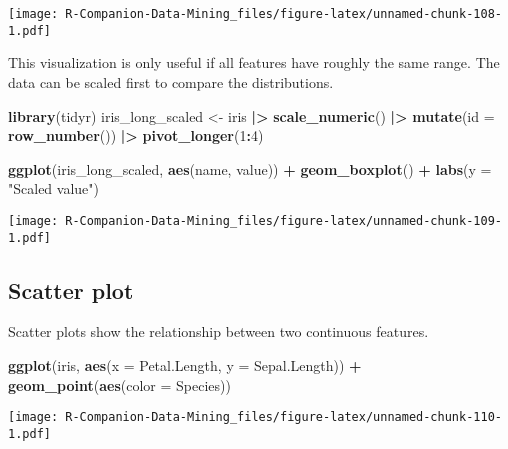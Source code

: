 \documentclass[
  notitlepage]{book}
\newenvironment{Shaded}{\begin{snugshade}}{\end{snugshade}}
\newcommand{\DataTypeTok}[1]{\textcolor[rgb]{0.13,0.29,0.53}{#1}}
\newcommand{\DecValTok}[1]{\textcolor[rgb]{0.00,0.00,0.81}{#1}}
\newcommand{\ErrorTok}[1]{\textcolor[rgb]{0.64,0.00,0.00}{\textbf{#1}}}
\newcommand{\KeywordTok}[1]{\textcolor[rgb]{0.13,0.29,0.53}{\textbf{#1}}}
\newcommand{\NormalTok}[1]{#1}
\newcommand{\OperatorTok}[1]{\textcolor[rgb]{0.81,0.36,0.00}{\textbf{#1}}}
\newcommand{\StringTok}[1]{\textcolor[rgb]{0.31,0.60,0.02}{#1}}
\begin{document}
\texttt{[image: R-Companion-Data-Mining\_files/figure-latex/unnamed-chunk-108-1.pdf]}

This visualization is only useful if all features have roughly the same
range. The data can be scaled first to compare the distributions.

\begin{Shaded}
\begin{Highlighting}[]
\KeywordTok{library}\NormalTok{(tidyr)}
\NormalTok{iris\_long\_scaled \textless{}{-}}\StringTok{ }\NormalTok{iris }\OperatorTok{|}\ErrorTok{\textgreater{}}\StringTok{ }
\StringTok{  }\KeywordTok{scale\_numeric}\NormalTok{() }\OperatorTok{|}\ErrorTok{\textgreater{}}\StringTok{ }
\StringTok{  }\KeywordTok{mutate}\NormalTok{(}\DataTypeTok{id =} \KeywordTok{row\_number}\NormalTok{()) }\OperatorTok{|}\ErrorTok{\textgreater{}}\StringTok{ }\KeywordTok{pivot\_longer}\NormalTok{(}\DecValTok{1}\OperatorTok{:}\DecValTok{4}\NormalTok{)}

\KeywordTok{ggplot}\NormalTok{(iris\_long\_scaled, }\KeywordTok{aes}\NormalTok{(name, value)) }\OperatorTok{+}\StringTok{ }
\StringTok{  }\KeywordTok{geom\_boxplot}\NormalTok{() }\OperatorTok{+}
\StringTok{  }\KeywordTok{labs}\NormalTok{(}\DataTypeTok{y =} \StringTok{"Scaled value"}\NormalTok{)}
\end{Highlighting}
\end{Shaded}

\texttt{[image: R-Companion-Data-Mining\_files/figure-latex/unnamed-chunk-109-1.pdf]}

\hypertarget{scatter-plot}{%
\subsection{Scatter plot}\label{scatter-plot}}

Scatter plots show the relationship between two continuous features.

\begin{Shaded}
\begin{Highlighting}[]
\KeywordTok{ggplot}\NormalTok{(iris, }\KeywordTok{aes}\NormalTok{(}\DataTypeTok{x =}\NormalTok{ Petal.Length, }\DataTypeTok{y =}\NormalTok{ Sepal.Length)) }\OperatorTok{+}\StringTok{ }
\StringTok{  }\KeywordTok{geom\_point}\NormalTok{(}\KeywordTok{aes}\NormalTok{(}\DataTypeTok{color =}\NormalTok{ Species))}
\end{Highlighting}
\end{Shaded}

\texttt{[image: R-Companion-Data-Mining\_files/figure-latex/unnamed-chunk-110-1.pdf]}
\end{document}
